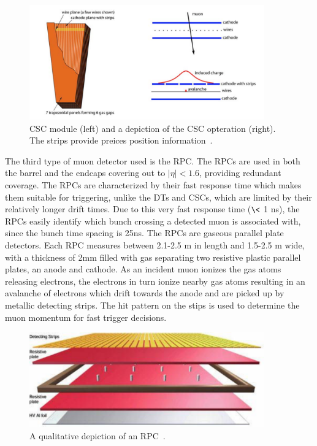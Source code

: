 \begin{figure}[hbtp]
 \begin{center}
   \includegraphics[width=0.9\textwidth]{ch3_figs/cms_csc.pdf}
   \caption[CSC module and operation schematic]{CSC module (left) and a depiction of the CSC opteration (right). The strips provide preices position information~\cite{cms_bluebook}.}
   \label{fig:cms_csc}
 \end{center}
\end{figure}

The third type of muon detector used is the RPC. The RPCs are used in both the barrel and the endcaps covering out to $|\eta| < 1.6$,
providing redundant coverage. The RPCs are characterized by their fast response time which makes them suitable for triggering, unlike the DTs and CSCs, which 
are limited by their relatively longer drift times.
Due to this very fast response time ($\<$ 1 ns), the RPCs easily identify which bunch crossing a detected muon is associated with, since the bunch time spacing is 25ns.  
The RPCs are gaseous parallel plate detectors. Each RPC measures between 2.1-2.5 m in length and 1.5-2.5 m wide, with a thickness of 2mm filled with gas separating
two resistive plastic parallel plates, an anode and cathode.
As an incident muon ionizes the gas atoms releasing electrons, the electrons in turn ionize nearby gas atoms resulting in an avalanche of electrons which drift towards the anode
and are picked up by metallic detecting strips. The hit pattern on the stips is used to determine the muon momentum for fast trigger decisions.

\begin{figure}[hbtp]
 \begin{center}
   \includegraphics[width=0.9\textwidth]{ch3_figs/cms_rpc.pdf}
   \caption[CMS RPC diagram]{A qualitative depiction of an RPC~\cite{cms_bluebook}.}
   \label{fig:cms_rpc}
 \end{center}
\end{figure}
 
